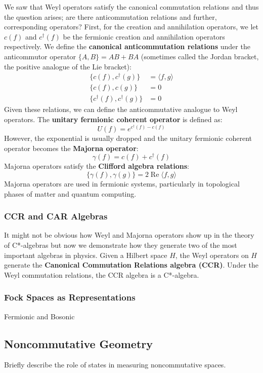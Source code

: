 \noindent We saw that Weyl operators satisfy the canonical commutation relations and thus
the question arises; are there anticommutation relations and further, corresponding
operators? First, for the creation and annihilation operators, we let $c(f)$ and $c^\dagger(f)$
be the fermionic creation and annihilation operators respectively. We define the
\textbf{canonical anticommutation relations} under the anticommutor operator $\{A,B\} = AB + BA$
(sometimes called the Jordan bracket, the positive analogue of the Lie bracket):
\begin{align}
    \{ c(f), c^\dagger (g)\} &= \langle f,g \rangle\\
    \{ c(f), c(g)\} &=0\\
    \{ c^\dagger(f), c^\dagger(g)\} &= 0
\end{align}
Given these relations, we can define the anticommutative analogue to Weyl operators.
The \textbf{unitary fermionic coherent operator} is defined as:
\begin{equation}
    U(f) = e^{c^\dagger(f) - c(f)}
\end{equation}
However, the exponential is usually dropped and the unitary fermionic coherent operator
becomes the \textbf{Majorna operator}:
\begin{equation}
    \gamma(f) = c(f) + c^\dagger(f)
\end{equation}
Majorna operators satisfy the \textbf{Clifford algebra relations}:
\begin{equation}
    \{ \gamma(f), \gamma(g) \} = 2 \operatorname{Re} \langle f, g \rangle
\end{equation}
Majorna operators are used in fermionic systems, particularly in topological phases
of matter and quantum computing.

\subsubsection{CCR and CAR Algebras}
It might not be obvious how Weyl and Majorna operators show up in the theory of C*-algebras
but now we demonstrate how they generate two of the most important algebras in
physics. Given a Hilbert space $H$, the Weyl operators on $H$ generate the
\textbf{Canonical Commutation Relations algebra (CCR)}. Under the Weyl commutation relations,
the CCR algebra is a C*-algebra.

\subsubsection{Fock Spaces as Representations}
Fermionic and Bosonic
\subsection{Noncommutative Geometry}
Briefly describe the role of states in measuring noncommutative spaces.